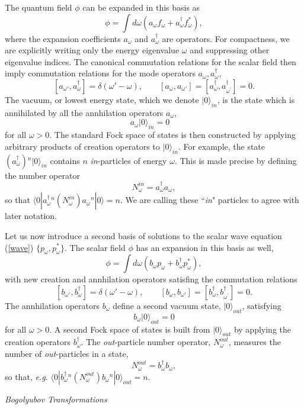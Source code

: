 \documentclass[12pt]{article}
\newcommand{\be}{\begin{equation}}
\newcommand{\ee}{\end{equation}}
\newcommand{\p}{\partial}
\def\f{f_{\omega}}
\def\p{p_{\omega}}
\def\a{a_\omega}
\def\ad{a^{\dagger}_{\omega} }
\def\b{b_{\omega}}
\def\bd{b^{\dagger}_{\omega} }
\begin{document}
The quantum field $\phi$ can be expanded in this basis as
%
\be\label{basis}\phi = \int d\omega (  \a \f + \a^{\dagger} \f^* ) ,\ee
%
where the expansion coefficients $\a$ and $\ad$ are operators.
For compactness, we are explicitly writing only the energy eigenvalue
$\omega$ and
suppressing other eigenvalue indices. The canonical commutation relations
for the scalar
field then imply commutation relations for the mode operators $\a ,\ad$,
%
\be\label{commute} [ a_{\omega '},\ad ] =\delta (\omega ' -\omega ),\qquad
[ a_{\omega },a_{\omega '} ]=[a^\dagger_\omega, a^\dagger_{\omega^\prime}]=0.\ee
%
The vacuum, or lowest energy state, which we denote $|0\rangle_{in}$,
is the state which is annihilated by all the annhilation operators $\a$,
%
\be\label{avac} \a |0\rangle_{in} =0 \quad\ee
%
for all $\omega>0$.
The standard Fock space of states is then constructed by applying arbitrary
products of creation operators to $|0\rangle_{in}$.  For example,
the state $(\ad ){}^n|0\rangle_{in}$ contains $n$ {\it in}-particles of energy
$\omega$. This is
made precise by defining the number operator
%
\be\label{numbop}N_{\omega}^{in} =\ad \a, \ee
%
so that $\langle0| \ad {}^n (N^{in}_\omega )   \a {}^n|0\rangle = n$.
We are calling these ``{\it in}" particles to agree with later notation.

Let us now introduce a second basis of solutions to the scalar wave
equation (\ref{wave})
$\{ \p,\p^*\}$.  The scalar field $\phi$ has an expansion in this basis as well,
%
\be\label{basistwo}\phi = \int d\omega (  \b \p + \b^{\dagger} \p^* ), \ee
%
with new creation and annhilation operators satisfing the commutation relations
%
\be\label{commuteb} [ b_{\omega '},\bd ] =\delta (\omega ' -\omega ),\qquad
[ b_{\omega },b_{\omega '} ]=[b^\dagger_\omega, b^\dagger_{\omega^\prime}]=0.\ee
%
The annhilation operators $\b$ define a second vacuum state, $|0\rangle_{out}$,
satisfying
%
\be\label{bvac}\b |0\rangle_{out} =0\ee
%
for all $\omega>0$.
A second Fock space of states is built from $|0\rangle_{out}$ by applying the
creation operators $\bd$. The {\it out}-particle number operator,
$N_\omega^{out}$, measures
the number of {\it out}-particles in a state,
%
\be\label{numbopb}N_{\omega}^{out} =\bd \b ,\ee
%
so that, {\it e.g.} $\langle0| \bd {}^n (N_\omega ^{out} )   \b {}^n|0\rangle_{out} = n$.

\goodbreak\vskip 0.1in\noindent
{\it Bogolyubov Transformations}
\vskip 0.05in
\end{document}
